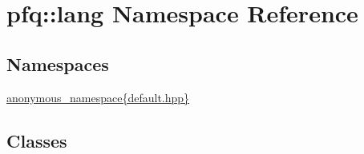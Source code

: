 \hypertarget{namespacepfq_1_1lang}{\section{pfq\+:\+:lang Namespace Reference}
\label{namespacepfq_1_1lang}
}
\subsection*{Namespaces}
\begin{DoxyCompactItemize}
\item 
 \hyperlink{namespacepfq_1_1lang_1_1anonymous__namespace_02default_8hpp_03}{anonymous\+\_\+namespace\{default.\+hpp\}}
\end{DoxyCompactItemize}
\subsection*{Classes}
